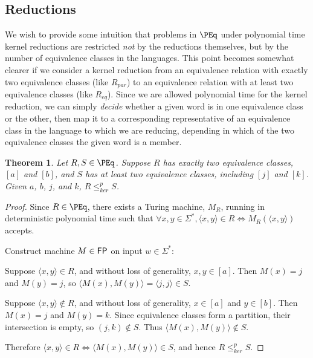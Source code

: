 \documentclass{article}
\newtheorem{theorem}{Theorem}[section]
\theoremstyle{definition} \newtheorem{definition}[definition]{Definition}
\newcommand{\sigmastar}{\Sigma^{*}} %
\newcommand{\kr}{\leq^{p}_{ker}} %
\newcommand{\pair}[2]{\langle#1,#2\rangle} %
\begin{document}
\subsection{Reductions}

We wish to provide some intuition that problems in $\PEq$ under polynomial time
kernel reductions are restricted \emph{not} by the reductions themselves, but
by the number of equivalence classes in the languages. This point becomes
somewhat clearer if we consider a kernel reduction from an equivalence relation
with exactly two equivalence classes (like $R_{par}$) to an equivalence
relation with at least two equivalence classes (like $R_{eq}$). Since we are
allowed polynomial time for the kernel reduction, we can simply \emph{decide}
whether a given word is in one equivalence class or the other, then map it to a
corresponding representative of an equivalence class in the language to which
we are reducing, depending in which of the two equivalence classes the given
word is a member.

\begin{theorem}\label{thm:two_eq_classes}
  Let $R,S\in\PEq$. Suppose $R$ has exactly two equivalence classes, $[a]$ and
  $[b]$, and $S$ has at least two equivalence classes, including $[j]$ and
  $[k]$. Given $a$, $b$, $j$, and $k$, $R\kr S$.
\end{theorem}
\begin{proof}
  Since $R\in\PEq$, there exists a Turing machine, $M_R$, running in
  deterministic polynomial time such that $\forall x,y\in\sigmastar,
  \pair{x}{y}\in R\iff M_R(\pair{x}{y})$ accepts.

  Construct machine $M\in{\ensuremath{\mathsf{FP}}}$ on input $w\in\sigmastar$:\\
  \begin{algorithm}[H]
    \eIf{$M_R(\pair{w}{a})$ accepts}{
      \Return{j}
    }{
      \Return{k}
    }
  \end{algorithm}

  Suppose $\pair{x}{y}\in R$, and without loss of generality, $x,y\in[a]$. Then
  $M(x)=j$ and $M(y)=j$, so $\pair{M(x)}{M(y)}=\pair{j}{j}\in S$.

  Suppose $\pair{x}{y}\notin R$, and without loss of generality, $x\in[a]$ and
  $y\in[b]$. Then $M(x)=j$ and $M(y)=k$. Since equivalence classes form a
  partition, their intersection is empty, so $(j,k)\notin S$. Thus
  $\pair{M(x)}{M(y)}\notin S$.

  Therefore $\pair{x}{y}\in R\iff \pair{M(x)}{M(y)}\in S$, and hence $R\kr S$.
\end{proof}
\end{document}
